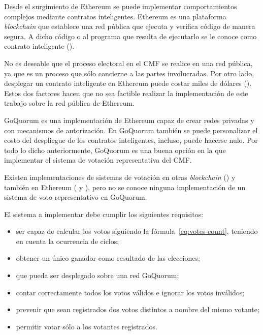 
Desde el surgimiento de Ethereum se puede implementar comportamientos complejos mediante contratos inteligentes. Ethereum es una plataforma \textit{blockchain} que establece una red p\'ublica que ejecuta y verifica c\'odigo de manera segura.  A dicho c\'odigo o al programa que resulta de ejecutarlo se le conoce como contrato inteligente (\cite{eth-aws}).  

No es deseable que el proceso electoral en el CMF se realice en una red p\'ublica, ya que es un proceso que s\'olo concierne a las partes involucradas. Por otro lado, desplegar un contrato inteligente en Ethereum puede costar miles de d\'olares (\cite{eth-deploy}). Estos dos factores hacen que no sea factible realizar la implementaci\'on de este trabajo sobre la red p\'ublica de Ethereum. 


GoQuorum es una implementaci\'on de Ethereum capaz de crear redes privadas y con mecanismos de autorizaci\'on. En GoQuorum tambi\'en se puede personalizar el costo del despliegue de los contratos inteligentes, incluso, puede hacerse nulo. Por todo lo dicho anteriormente, GoQuorum es una buena opci\'on en la que implementar el sistema de votaci\'on representativa del CMF.


Existen implementaciones de sistemas de votaci\'on en otras \textit{blockchain} (\cite{agora}) y tambi\'en en Ethereum (\cite{ovn} y \cite{borda_count}), pero no se conoce ninguna implementaci\'on de un sistema de voto representativo en GoQuorum.

El sistema a implementar debe cumplir los siguientes requisitos:


\begin{itemize}
    \item ser capaz de calcular los votos siguiendo la f\'ormula~\eqref{eq:votes-count}, teniendo en cuenta la ocurrencia de ciclos;
    \item obtener un \'unico ganador como resultado de las elecciones;
    \item que pueda ser desplegado sobre una red GoQuorum;
    \item contar correctamente todos los votos v\'alidos e ignorar los votos inv\'alidos;
    \item prevenir que sean registrados dos votos distintos a nombre del mismo votante;
    \item permitir votar s\'olo a los votantes registrados.
\end{itemize}

